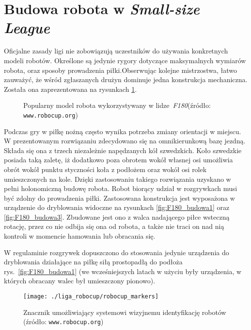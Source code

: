 \section{Budowa robota \label{sec:budowa_robota} w \emph{Small-size League}}
	Oficjalne zasady ligi nie zobowiązują uczestników do używania konkretnych modeli robotów. Określone są jedynie rygory dotyczące maksymalnych wymiarów robota,
	oraz sposoby prowadzenia piłki.Obserwując kolejne mistrzostwa, łatwo zauważyć, że wśród zgłaszanych drużyn dominuje jedna konstrukcja mechaniczna.
	Została ona zaprezentowana na  rysunkach \ref{fig:F180_budowa}.
	\begin{figure}
	\centering
	\caption{Popularny model robota wykorzystywany w \mbox{lidze \emph{F180}}\newline(źródło: \texttt{www.robocup.org}) }
	\label{fig:F180_budowa}
	\end{figure}
	Podczas gry w piłkę nożną często wynika potrzeba zmiany orientacji w miejscu. W prezentowanym rozwiązaniu
	zdecydowano się na omnikierunkową bazę jezdną. Składa się ona z trzech niezależnie napędzanych kół szwedzkich.
	Koło szwedzkie posiada taką zaletę, iż dodatkowo poza obrotem wokół własnej osi umożliwia obrót
	wokół punktu styczności koła z podłożem oraz wokół osi rolek umieszczonych na kole.
	Dzięki zastosowaniu takiego rozwiązania uzyskano w pełni holonomiczną budowę robota.
	Robot biorący udział w rozgrywkach musi być zdolny do prowadzenia piłki. Zastosowana konstrukcja jest wyposażona w urządzenie do dryblowania widoczne na rysunkach \ref{fig:F180_budowa1} oraz \ref{fig:F180_budowa3}. 
	Zbudowane jest ono z walca nadającego piłce wsteczną rotację, przez co nie odbija się ona od robota, a także nie traci on nad nią kontroli w momencie hamowania lub obracania się.

	W regulaminie rozgrywek dopuszczono do stosowania jedynie urządzenia do dryblowania działające na piłkę siłą prostopadłą do podłoża rys.~\ref{fig:F180_budowa1} (we wcześniejszych latach
	w użyciu były  urządzenia, w których obracany walec był umieszczony pionowo).
	\begin{wrapfigure}{r}{0.42\textwidth}
	\vspace{-20pt}
	\begin{center}	
	\texttt{[image: ./liga\_robocup/robocup\_markers]}
	\end{center}
	\caption{Znacznik umożliwiający systemowi wizyjnemu identyfikację robotów \newline(źródło: \texttt{www.robocup.org})\label{fig:znacznik}}
	\vspace{-10pt}
	\end{wrapfigure}
	
